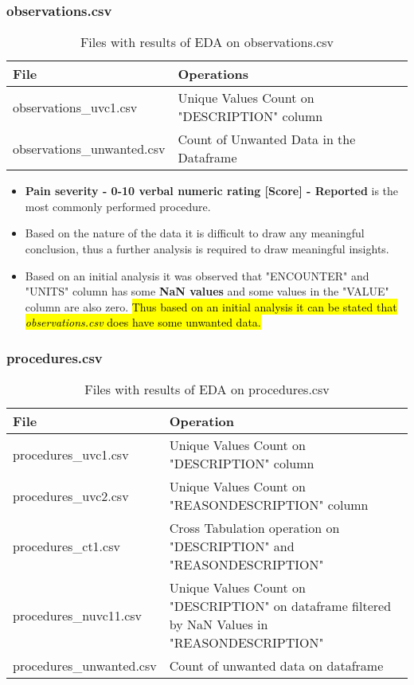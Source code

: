 \documentclass[12pt, twosided]{report}  %
\begin{document}
\subsubsection{observations.csv}

\begin{table}[H]
	\centering
	\begin{tabular}{p{5cm}|p{14.5cm}}
		\textbf{File} & \textbf{Operations} \\ \hline
		observations\_uvc1.csv     & Unique Values Count on "DESCRIPTION" column \\
		observations\_unwanted.csv & Count of Unwanted Data in the Dataframe
		\end{tabular}
	\caption{Files with results of EDA on observations.csv}
\end{table}


\begin{itemize}

\item \textbf{Pain severity - 0-10 verbal numeric rating [Score] - Reported} is the most commonly performed procedure.

\item Based on the nature of the data it is difficult to draw any meaningful conclusion, thus a further analysis is required to draw meaningful insights.

\item Based on an initial analysis it was observed that "ENCOUNTER" and "UNITS" column has some \textbf{NaN values} and some values in the "VALUE" column are also zero. \hl{Thus based on an initial analysis it can be stated that \textit{observations.csv} does have some unwanted data.}

\end{itemize}

\subsubsection{procedures.csv}

\begin{table}[H]
	\centering
	\begin{tabular}{p{4.5cm}|p{15cm}}
		\textbf{File}            & \textbf{Operation} \\ \hline
		procedures\_uvc1.csv     & Unique Values Count on "DESCRIPTION" column \\
		procedures\_uvc2.csv     & Unique Values Count on "REASONDESCRIPTION" column \\
		procedures\_ct1.csv      & Cross Tabulation operation on "DESCRIPTION" and "REASONDESCRIPTION" \\
		procedures\_nuvc11.csv      & Unique Values Count on "DESCRIPTION" on dataframe filtered by NaN Values in "REASONDESCRIPTION" \\
		procedures\_unwanted.csv & Count of unwanted data on dataframe
	\end{tabular}
	\caption{Files with results of EDA on procedures.csv}
\end{table}
\end{document}
